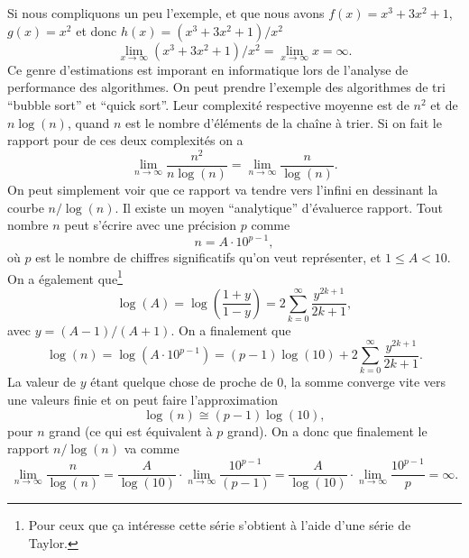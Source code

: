 \documentclass[a4paper,12pt]{book}
\begin{document}
Si nous compliquons un peu l'exemple, et que nous avons $f(x)=x^3+3x^2+1$, $g(x)=x^2$ et donc $h(x)=(x^3+3x^2+1)/x^2$
\begin{equation}
 \lim_{x\rightarrow\infty} (x^3+3x^2+1)/x^2=\lim_{x\rightarrow\infty} x=\infty.
\end{equation}
Ce genre d'estimations est imporant en informatique lors de l'analyse de performance des algorithmes.
On peut prendre l'exemple des algorithmes de tri ``bubble sort'' et ``quick sort''. Leur complexité 
respective moyenne est de $n^2$ et de $n\log(n)$, quand $n$ est le nombre d'éléments de la chaîne à trier.
Si on fait le rapport pour de ces deux complexités on a 
\begin{equation}
 \lim_{n\rightarrow\infty} \frac{n^2}{n\log(n)}=\lim_{n\rightarrow\infty} \frac{n}{\log(n)}.
\end{equation}
On peut simplement voir que ce rapport va tendre vers l'infini en dessinant la courbe $n/\log(n)$. 
Il existe un moyen ``analytique'' d'évaluerce rapport. Tout nombre $n$ peut s'écrire avec une précision $p$ comme
\begin{equation}
 n=A\cdot 10^{p-1},
\end{equation}
où $p$ est le nombre de chiffres significatifs qu'on veut représenter, et $1\leq A< 10$. On a également que\footnote{Pour ceux que ça intéresse 
cette série s'obtient à l'aide d'une série de Taylor.}
\begin{equation}
 \log(A)=\log\left(\frac{1+y}{1-y}\right)=2\sum_{k=0}^\infty \frac{y^{2k+1}}{2k+1},
\end{equation}
avec $y=(A-1)/(A+1)$. On a finalement que
\begin{equation}
 \log(n)=\log(A\cdot 10^{p-1})=(p-1)\log(10)+2\sum_{k=0}^\infty \frac{y^{2k+1}}{2k+1}.
\end{equation}
La valeur de $y$ étant quelque chose de proche de 0, la somme converge vite vers une valeurs finie et on peut faire l'approximation
\begin{equation}
 \log(n)\cong(p-1)\log(10),
\end{equation}
pour $n$ grand (ce qui est équivalent à $p$ grand).
On a donc que finalement le rapport $n/\log(n)$ va comme
\begin{equation}
 \lim_{n\rightarrow\infty}\frac{n}{\log(n)}=\frac{A}{\log(10)}\cdot\lim_{n\rightarrow\infty}\frac{10^{p-1}}{(p-1)}=\frac{A}{\log(10)}\cdot\lim_{n\rightarrow\infty}\frac{10^{p-1}}{p}=\infty.
\end{equation}
\end{document}
